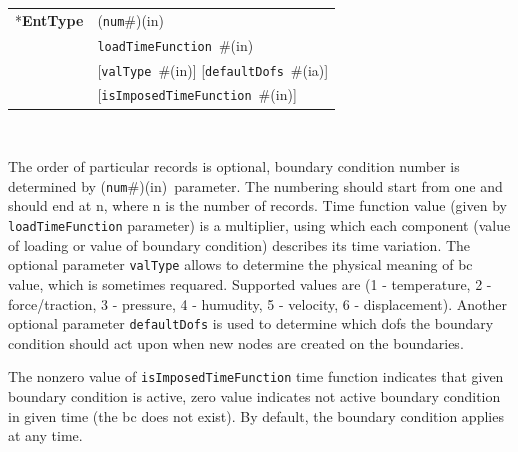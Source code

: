 \documentclass[a4paper]{article}
\makeatletter
\newcommand{\param}[1]{\texttt{#1}} %
\newcommand{\optional}[1]{[#1]} %
\newcommand{\field}[2]{\param{#1}~\#{\tiny(#2)}} %
\newcommand{\optField}[2]{\optional{\field{#1}{#2}}}
\newcommand{\componentNum}{(\param{num}\#){\tiny(in)}} %
\newcommand{\entKeyword}[1]{*\textbf{#1}} %
\newenvironment{record}[1][]{\begin{tabular}{|ll}}{\end{tabular}\\}
\newcommand{\recentry}[2]{{#1}&{#2}\\}
\newcounter{rcc}
\newenvironment{record}[1][\textwidth]{\setcounter{rcc}{0}\begin{tabular*}{#1}{|ll@{\extracolsep{\fill}}r}}{\end{tabular*}\\}
\newcommand{\recentry}[2]{\ifthenelse{\value{rcc}>0}{&$\backslash$ \\}{\setcounter{rcc}{1}}{#1}&{#2}}
\makeatother
\begin{document}
\noindent
\begin{record}
  \recentry{\entKeyword{EntType}}{\componentNum}
  \recentry{}{\field{loadTimeFunction}{in}}
  \recentry{}{\optField{valType}{in} \optField{defaultDofs}{ia}}
  \recentry{}{\optField{is\-Impo\-sed\-Ti\-me\-Fun\-ction}{in}}
\end{record}

The order of particular  records is optional, boundary condition number is determined by \componentNum\ parameter.
The numbering should start from one and should end at n, where n is the number of records.
Time function value (given by \param{loadTimeFunction} parameter) is a multiplier, using which
each  component (value of loading or value of boundary condition)
describes its time variation.
The optional parameter \param{valType} allows to determine the
physical meaning of bc value, which is sometimes requared. Supported
values are (1 - temperature, 2 - force/traction,
3 - pressure, 4 - humudity, 5 - velocity, 6 - displacement).
Another optional parameter \param{defaultDofs} is used to determine which dofs the boundary condition should act
upon when new nodes are created on the boundaries.

The nonzero value of \param{isImposedTimeFunction} time function
indicates that given boundary condition is active, zero value
indicates not active boundary condition in given time (the bc does not
exist). By default, the boundary condition applies at any time.
\end{document}
